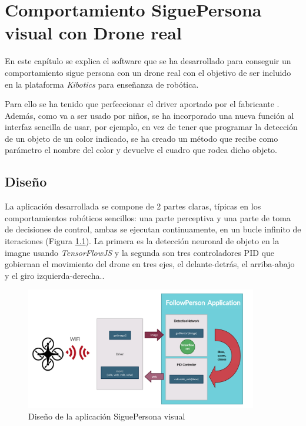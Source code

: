 \chapter{Comportamiento SiguePersona visual con Drone real}\label{cap.real}
En este capítulo se explica el software que se ha desarrollado para conseguir un comportamiento sigue persona con un drone real con el objetivo de ser incluido en la plataforma \textit{Kibotics} para enseñanza de robótica.

Para ello se ha tenido que perfeccionar el driver aportado por el fabricante \cite{tellodriver}. Además, como va a ser usado por niños, se ha incorporado una nueva función al interfaz sencilla de usar, por ejemplo, en vez de tener que programar la detección de un objeto de un color indicado, se ha creado un método que recibe como parámetro el nombre del color y devuelve el cuadro que rodea dicho objeto.

\section{Diseño}
La aplicación desarrollada se compone de 2 partes claras, típicas en los comportamientos robóticos sencillos: una parte perceptiva y una parte de toma de decisiones de control, ambas se ejecutan continuamente, en un bucle infinito de iteraciones (Figura \ref{fig:esquemaReal}). La primera es la detección neuronal de objeto en la imagne usando \textit{TensorFlowJS} y la segunda son tres controladores PID que gobiernan el movimiento del drone en tres ejes, el delante-detrás, el arriba-abajo y el giro izquierda-derecha..
\begin{figure}[H]
  \begin{center}
    \includegraphics[width=0.9\textwidth]{figures/real/esquema2.png}
		\caption{Diseño de la aplicación SiguePersona visual}
		\label{fig:esquemaReal}
		\end{center}
\end{figure}

